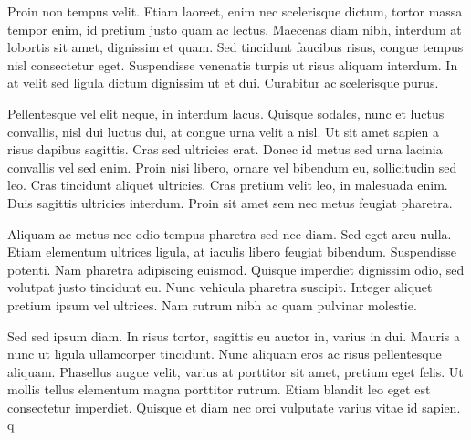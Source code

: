 Proin non tempus velit. Etiam laoreet, enim nec scelerisque dictum,
tortor massa tempor enim, id pretium justo quam ac lectus. Maecenas
diam nibh, interdum at lobortis sit amet, dignissim et quam. Sed
tincidunt faucibus risus, congue tempus nisl consectetur
eget. Suspendisse venenatis turpis ut risus aliquam interdum. In at
velit sed ligula dictum dignissim ut et dui. Curabitur ac scelerisque
purus.

Pellentesque vel elit neque, in interdum lacus. Quisque sodales, nunc
et luctus convallis, nisl dui luctus dui, at congue urna velit a
nisl. Ut sit amet sapien a risus dapibus sagittis. Cras sed ultricies
erat. Donec id metus sed urna lacinia convallis vel sed enim. Proin
nisi libero, ornare vel bibendum eu, sollicitudin sed leo. Cras
tincidunt aliquet ultricies. Cras pretium velit leo, in malesuada
enim. Duis sagittis ultricies interdum. Proin sit amet sem nec metus
feugiat pharetra.

Aliquam ac metus nec odio tempus pharetra sed nec diam. Sed eget arcu
nulla. Etiam elementum ultrices ligula, at iaculis libero feugiat
bibendum. Suspendisse potenti. Nam pharetra adipiscing
euismod. Quisque imperdiet dignissim odio, sed volutpat justo
tincidunt eu. Nunc vehicula pharetra suscipit. Integer aliquet pretium
ipsum vel ultrices. Nam rutrum nibh ac quam pulvinar molestie.

Sed sed ipsum diam. In risus tortor, sagittis eu auctor in, varius in
dui. Mauris a nunc ut ligula ullamcorper tincidunt. Nunc aliquam eros
ac risus pellentesque aliquam. Phasellus augue velit, varius at
porttitor sit amet, pretium eget felis. Ut mollis tellus elementum
magna porttitor rutrum. Etiam blandit leo eget est consectetur
imperdiet. Quisque et diam nec orci vulputate varius vitae id sapien.
q


